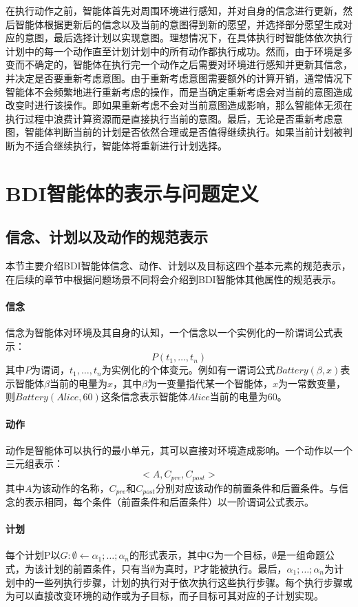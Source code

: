 在执行动作之前，智能体首先对周围环境进行感知，并对自身的信念进行更新，然后智能体根据更新后的信念以及当前的意图得到新的愿望，并选择部分愿望生成对应的意图，最后选择计划以实现意图。理想情况下，在具体执行时智能体依次执行计划中的每一个动作直至计划计划中的所有动作都执行成功。然而，由于环境是多变而不确定的，智能体在执行完一个动作之后需要对环境进行感知并更新其信念，并决定是否要重新考虑意图。由于重新考虑意图需要额外的计算开销，通常情况下智能体不会频繁地进行重新考虑的操作，而是当确定重新考虑会对当前的意图造成改变时进行该操作。即如果重新考虑不会对当前意图造成影响，那么智能体无须在执行过程中浪费计算资源而是直接执行当前的意图。最后，无论是否重新考虑意图，智能体判断当前的计划是否依然合理或是否值得继续执行。如果当前计划被判断为不适合继续执行，智能体将重新进行计划选择。

\section{BDI智能体的表示与问题定义}
\subsection{信念、计划以及动作的规范表示}
本节主要介绍BDI智能体信念、动作、计划以及目标这四个基本元素的规范表示，在后续的章节中根据问题场景不同将会介绍到BDI智能体其他属性的规范表示。
\paragraph{信念}
信念为智能体对环境及其自身的认知，一个信念以一个实例化的一阶谓词公式表示：
$$P(t_1, \ldots,t_n)$$
其中$P$为谓词，$t_1, \ldots,t_n$为实例化的个体变元。例如有一谓词公式$Battery(\beta, x)$表示智能体$\beta$当前的电量为$x$，其中$\beta$为一变量指代某一个智能体，$x$为一常数变量，则$Battery(Alice, 60)$这条信念表示智能体$Alice$当前的电量为$60$。
\paragraph{动作}
动作是智能体可以执行的最小单元，其可以直接对环境造成影响。一个动作以一个三元组表示：
$$<A,C_{pre},C_{post}>$$
其中$A$为该动作的名称，$C_{pre}$和$C_{post}$分别对应该动作的前置条件和后置条件。与信念的表示相同，每个条件（前置条件和后置条件）以一阶谓词公式表示。
\paragraph{计划}
每个计划P以$G:\emptyset \gets \alpha_1; \dots;\alpha_n$的形式表示，其中G为一个目标，$\emptyset$是一组命题公式，为该计划的前置条件，只有当$\emptyset$为真时，P才能被执行。最后，$\alpha_1; \dots;\alpha_n$为计划中的一些列执行步骤，计划的执行对于依次执行这些执行步骤。每个执行步骤或为可以直接改变环境的动作或为子目标，而子目标可其对应的子计划实现。
